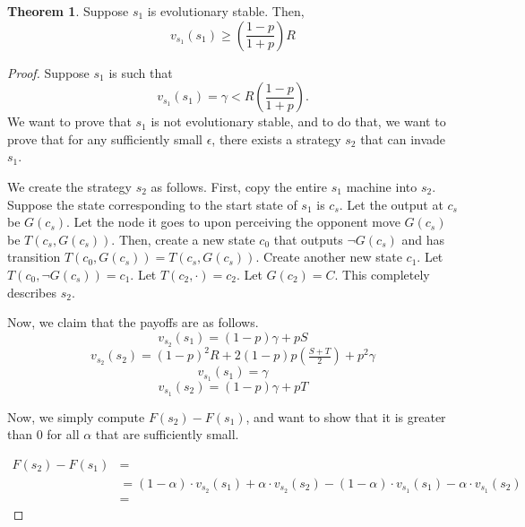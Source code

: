 \documentclass[11pt]{amsart}
\theoremstyle{definition}
\newtheorem{theorem}{Theorem}
\theoremstyle{remark}
\begin{document}
    \begin{theorem}
      \label{preciseevolutionarystable}
      Suppose $s_1$ is evolutionary stable. Then, 
      \begin{equation*}
        v_{s_1}(s_1) \geq \left(\frac{1-p}{1+p}\right) R
      \end{equation*}
    \end{theorem}
    \begin{proof}
      Suppose $s_1$ is such that \begin{equation*}
        v_{s_1}(s_1) = \gamma < R \left(\frac{1-p}{1+p}\right).
      \end{equation*}
      We want to prove that $s_1$ is not evolutionary stable, and to do that, we want to prove that for any sufficiently small $\epsilon$, there exists a strategy $s_2$ that can invade $s_1$.

      We create the strategy $s_2$ as follows. First, copy the entire $s_1$ machine into $s_2$. Suppose the state corresponding to the start state of $s_1$ is $c_s$. Let the output at $c_s$ be $G(c_s)$. Let the node it goes to upon perceiving the opponent move $G(c_s)$ be $T(c_s, G(c_s))$. Then, create a new state $c_0$ that outputs $\lnot G(c_s)$ and has transition $T(c_0, G(c_s)) = T(c_s, G(c_s))$. Create another new state $c_1$. Let $T(c_0, \lnot G(c_s)) = c_1$. Let $T(c_2, \cdot) = c_2$. Let $G(c_2) = C$. This completely describes $s_2$.

      Now, we claim that the payoffs are as follows.
      \begin{equation}
        v_{s_2}(s_1) = (1 - p) \gamma  + p S
      \end{equation}
      \begin{equation}
        v_{s_2}(s_2) = (1-p)^{2} R + 2 (1-p) p (\tfrac{S + T}{2}) + p^2 \gamma
      \end{equation}
      \begin{equation}
        v_{s_1}(s_1) = \gamma
      \end{equation}
      \begin{equation}
        v_{s_1}(s_2) = (1-p) \gamma + p T
      \end{equation}

      Now, we simply compute $F(s_2) - F(s_1)$, and want to show that it is greater than 0 for all $\alpha$ that are sufficiently small.

      \begin{align*}
        F(s_2) - F(s_1) &= \\
        &= (1 - \alpha) \cdot v_{s_2}(s_1) + \alpha \cdot v_{s_2}(s_2) - (1 - \alpha) \cdot v_{s_1}(s_1) - \alpha \cdot v_{s_1}(s_2) \\
        &= 
      \end{align*}

    \end{proof}
\end{document}
